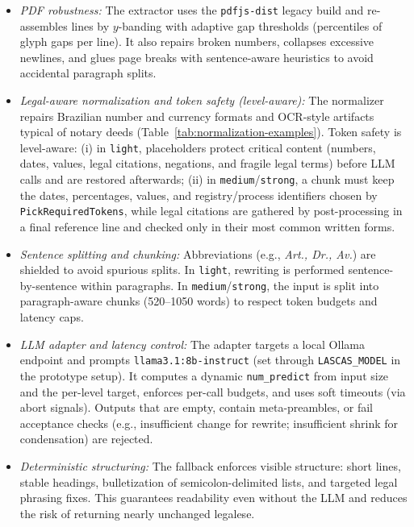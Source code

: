\documentclass[english]{UNISINOSartigo} %
\begin{document}
\begin{itemize}
\item \textit{PDF robustness:}
The extractor uses the \texttt{pdfjs-dist} legacy build and re-assembles lines by $y$-banding with adaptive gap thresholds (percentiles of glyph gaps per line). It also repairs broken numbers, collapses excessive newlines, and glues page breaks with sentence-aware heuristics to avoid accidental paragraph splits.

\item \textit{Legal-aware normalization and token safety (level-aware):}
The normalizer repairs Brazilian number and currency formats and OCR-style artifacts typical of notary deeds (Table~\ref{tab:normalization-examples}). Token safety is level-aware: (i) in \texttt{light}, placeholders protect critical content (numbers, dates, values, legal citations, negations, and fragile legal terms) before LLM calls and are restored afterwards; (ii) in \texttt{medium}/\texttt{strong}, a chunk must keep the dates, percentages, values, and registry/process identifiers chosen by \texttt{PickRequiredTokens}, while legal citations are gathered by post-processing in a final reference line and checked only in their most common written forms.

\item \textit{Sentence splitting and chunking:}
Abbreviations (e.g., \emph{Art., Dr., Av.}) are shielded to avoid spurious splits. In \texttt{light}, rewriting is performed sentence-by-sentence within paragraphs. In \texttt{medium}/\texttt{strong}, the input is split into paragraph-aware chunks (520--1050 words) to respect token budgets and latency caps.

\item \textit{LLM adapter and latency control:}
The adapter targets a local Ollama endpoint and prompts \texttt{llama3.1:8b-instruct} (set through \texttt{LASCAS\_MODEL} in the prototype setup). It computes a dynamic \texttt{num\_predict} from input size and the per-level target, enforces per-call budgets, and uses soft timeouts (via abort signals). Outputs that are empty, contain meta-preambles, or fail acceptance checks (e.g., insufficient change for rewrite; insufficient shrink for condensation) are rejected.

\item \textit{Deterministic structuring:}
The fallback enforces visible structure: short lines, stable headings, bulletization of semicolon-delimited lists, and targeted legal phrasing fixes. This guarantees readability even without the LLM and reduces the risk of returning nearly unchanged legalese.


\end{itemize}
\end{document}
